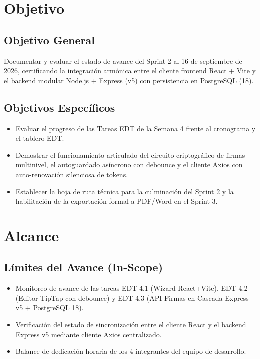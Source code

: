 \documentclass[12pt,a4paper]{article}
\begin{document}
\section{Objetivo}

\subsection{Objetivo General}
Documentar y evaluar el estado de avance del Sprint 2 al 16 de septiembre de 2026, certificando la integración armónica entre el cliente frontend React + Vite y el backend modular Node.js + Express (v5) con persistencia en PostgreSQL (18).

\subsection{Objetivos Específicos}
\begin{itemize}[leftmargin=1.5em, itemsep=1.5pt, topsep=1.5pt]
    \item Evaluar el progreso de las Tareas EDT de la Semana 4 frente al cronograma y el tablero EDT.
    \item Demostrar el funcionamiento articulado del circuito criptográfico de firmas multinivel, el autoguardado asíncrono con debounce y el cliente Axios con auto-renovación silenciosa de tokens.
    \item Establecer la hoja de ruta técnica para la culminación del Sprint 2 y la habilitación de la exportación formal a PDF/Word en el Sprint 3.
\end{itemize}

\section{Alcance}

\subsection{Límites del Avance (In-Scope)}
\begin{itemize}[leftmargin=1.5em, itemsep=1.5pt]
    \item Monitoreo de avance de las tareas EDT 4.1 (Wizard React+Vite), EDT 4.2 (Editor TipTap con debounce) y EDT 4.3 (API Firmas en Cascada Express v5 + PostgreSQL 18).
    \item Verificación del estado de sincronización entre el cliente React y el backend Express v5 mediante cliente Axios centralizado.
    \item Balance de dedicación horaria de los 4 integrantes del equipo de desarrollo.
\end{itemize}
\end{document}
